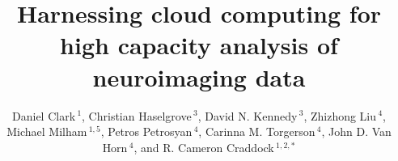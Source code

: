 \documentclass{frontiersSCNS} %
\def\firstAuthorLast{Sample {et~al.}} %
\def\Authors{Daniel Clark\,$^{1}$, Christian Haselgrove\,$^{3}$, David N. Kennedy\,$^{3}$, Zhizhong Liu\,$^{4}$, Michael Milham\,$^{1,5}$, Petros Petrosyan\,$^{4}$, Carinna M. Torgerson\,$^{4}$, John D. Van Horn\,$^{4}$, and R. Cameron Craddock\,$^{1,2,*}$}
\begin{document}
\onecolumn
{}

\title[Harnessing cloud computing]{Harnessing cloud computing for high capacity analysis of neuroimaging data} 

\author[\firstAuthorLast ]{\Authors} %
\address{} %
\correspondance{} %

\extraAuth{}%


\maketitle

\end{document}
